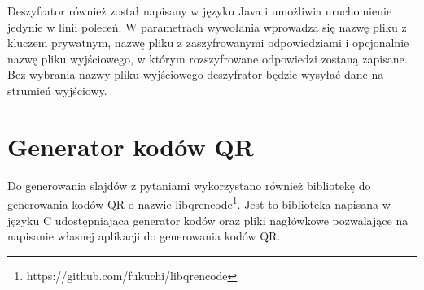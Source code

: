 \documentclass{report}
\begin{document}
		Deszyfrator również został napisany w języku Java i umożliwia uruchomienie jedynie w linii poleceń. W parametrach wywołania wprowadza się nazwę pliku z kluczem prywatnym, nazwę pliku z zaszyfrowanymi odpowiedziami i opcjonalnie nazwę pliku wyjściowego, w którym rozszyfrowane odpowiedzi zostaną zapisane. Bez wybrania nazwy pliku wyjściowego deszyfrator będzie wysyłać dane na strumień wyjściowy.
		
		\section{Generator kodów QR}
		
		Do generowania slajdów z pytaniami wykorzystano również bibliotekę do generowania kodów QR o nazwie libqrencode\footnote{https://github.com/fukuchi/libqrencode}. Jest to biblioteka napisana w języku C udostępniająca generator kodów oraz pliki nagłówkowe pozwalające na napisanie własnej aplikacji do generowania kodów QR.
			
\end{document}
